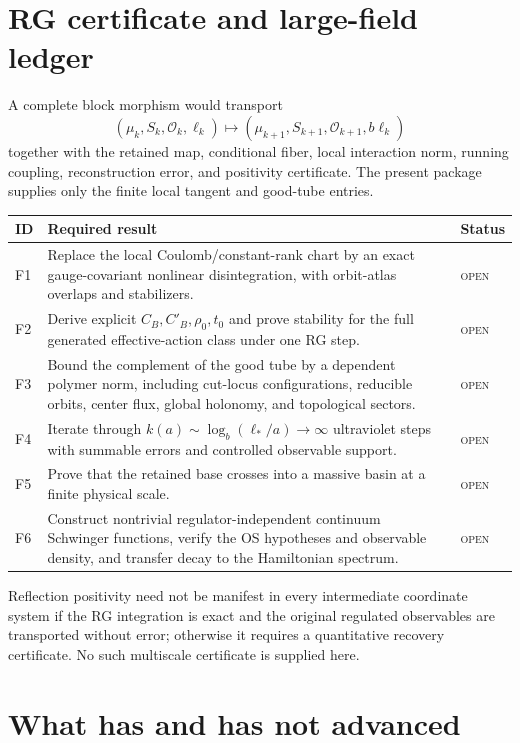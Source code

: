 \documentclass[11pt]{article}
\newcommand{\open}{\textcolor{openred}{\textsc{open}}}
\theoremstyle{remark}
\begin{document}
\section{RG certificate and large-field ledger}

A complete block morphism would transport
\[
 (\mu_k,S_k,\mathcal O_k,\ell_k)
 \longmapsto
 (\mu_{k+1},S_{k+1},\mathcal O_{k+1},b\ell_k)
\]
together with the retained map, conditional fiber, local interaction norm,
running coupling, reconstruction error, and positivity certificate.  The
present package supplies only the finite local tangent and good-tube entries.

\begin{longtable}{@{}p{}p{}p{}@{}}
\toprule
ID & Required result & Status\\
\midrule
\endhead
F1 & Replace the local Coulomb/constant-rank chart by an exact gauge-covariant
nonlinear disintegration, with orbit-atlas overlaps and stabilizers. & \open\\
F2 & Derive explicit $C_B,C'_B,\rho_0,t_0$ and prove stability for the full
generated effective-action class under one RG step. & \open\\
F3 & Bound the complement of the good tube by a dependent polymer norm,
including cut-locus configurations, reducible orbits, center flux, global
holonomy, and topological sectors. & \open\\
F4 & Iterate through $k(a)\sim\log_b(\ell_*/a)\to\infty$ ultraviolet steps
with summable errors and controlled observable support. & \open\\
F5 & Prove that the retained base crosses into a massive basin at a finite
physical scale. & \open\\
F6 & Construct nontrivial regulator-independent continuum Schwinger functions,
verify the OS hypotheses and observable density, and transfer decay to the
Hamiltonian spectrum. & \open\\
\bottomrule
\end{longtable}

Reflection positivity need not be manifest in every intermediate coordinate
system if the RG integration is exact and the original regulated observables
are transported without error; otherwise it requires a quantitative recovery
certificate.  No such multiscale certificate is supplied here.

\section{What has and has not advanced}
\end{document}
